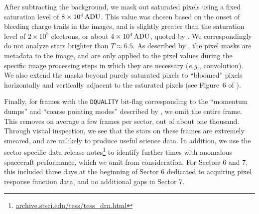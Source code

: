 \documentclass[12pt,twocolumn,tighten]{aastex62}
\begin{document}

After subtracting the background, we mask out saturated pixels using a
fixed saturation level of $8\times10^4\,{\rm ADU}$. This value was
chosen based on the onset of bleeding charge trails in the images, and
is slightly greater than the saturation level of $2\times10^5$
electrons, or about $4\times10^4\,{\rm ADU}$, quoted by
\citet{vanderspek_2018}. 
We correspondingly do not analyze stars brighter than $T\approx 6.5$.
As described by \citet{Pal_2009}, the pixel masks are metadata to the
image, and are only applied to the pixel values during the specific
image processing steps in which they are necessary ({\it e.g.},
convolution). We also extend the masks beyond purely saturated pixels
to ``bloomed'' pixels horizontally and vertically adjacent to the
saturated pixels (see Figure~6 of \citealt{Pal_2009}).

Finally, for frames with the \texttt{DQUALITY} bit-flag corresponding
to the ``momentum dumps'' and ``coarse pointing modes'' described by
\citet{vanderspek_2018}, we omit the entire frame.  This removes on
average a few frames per sector, out of about one thousand. Through
visual inspection, we see that the stars on these frames are extremely
smeared, and are unlikely to produce useful science data.  In
addition, we use the sector-specific data release notes\footnote{\url{
  archive.stsci.edu/tess/tess_drn.html}} to identify further times
with anomalous spacecraft performance, which we omit from
consideration.  For Sectors 6 and 7, this included three days at the
beginning of Sector 6 dedicated to acquiring pixel response function
data, and no additional gaps in Sector 7.
\end{document}
